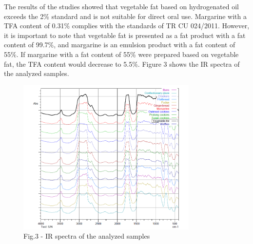 
The results of the studies showed that vegetable fat based on
hydrogenated oil exceeds the 2\% standard and is not suitable for direct
oral use. Margarine with a TFA content of 0.31\% complies with the
standards of TR CU 024/2011. However, it is important to note that
vegetable fat is presented as a fat product with a fat content of
99.7\%, and margarine is an emulsion product with a fat content of 55\%.
If margarine with a fat content of 55\% were prepared based on vegetable
fat, the TFA content would decrease to 5.5\%. Figure 3 shows the IR
spectra of the analyzed samples.

\begin{figure}[H]
	\centering
	\includegraphics[width=0.8\textwidth]{media/pish/image12}
	\caption*{Fig.3 - IR spectra of the analyzed samples}
\end{figure}

